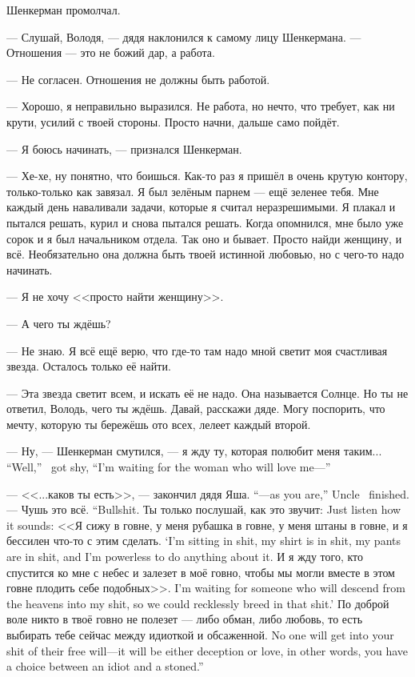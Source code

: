 Шенкерман промолчал.

--- Слушай, Володя, --- дядя наклонился к самому лицу Шенкермана.
--- Отношения --- это не божий дар, а работа.

--- Не согласен.
Отношения не должны быть работой.

--- Хорошо, я неправильно выразился.
Не работа, но нечто, что требует, как ни крути, усилий с твоей стороны.
Просто начни, дальше само пойдёт.

--- Я боюсь начинать, --- признался Шенкерман.

--- Хе-хе, ну понятно, что боишься.
Как-то раз я пришёл в очень крутую контору, только-только как завязал.
Я был зелёным парнем --- ещё зеленее тебя.
Мне каждый день наваливали задачи, которые я считал неразрешимыми.
Я плакал и пытался решать, курил и снова пытался решать.
Когда опомнился, мне было уже сорок и я был начальником отдела.
Так оно и бывает.
Просто найди женщину, и всё.
Необязательно она должна быть твоей истинной любовью, но с чего-то надо начинать.

--- Я не хочу <<просто найти женщину>>.

--- А чего ты ждёшь?

--- Не знаю.
Я всё ещё верю, что где-то там надо мной светит моя счастливая звезда.
Осталось только её найти.

--- Эта звезда светит всем, и искать её не надо.
Она называется Солнце.
Но ты не ответил, Володь, чего ты ждёшь.
Давай, расскажи дяде.
Могу поспорить, что мечту, которую ты бережёшь ото всех, лелеет каждый второй.

{--- Ну, --- Шенкерман смутился, --- я жду ту, которая полюбит меня таким...}
{``Well,'' \Shenkerman\ got shy, ``I'm waiting for the woman who will love me---''}

{---  <<...каков ты есть>>, --- закончил дядя Яша.}
{``---as you are,'' Uncle \Yasha\ finished.}
{--- Чушь это всё.}
{``Bullshit.}
{Ты только послушай, как это звучит:}
{Just listen how it sounds:}
{<<Я сижу в говне, у меня рубашка в говне, у меня штаны в говне, и я бессилен что-то с этим сделать.}
{`I'm sitting in shit, my shirt is in shit, my pants are in shit, and I'm powerless to do anything about it.}
{И я жду того, кто спустится ко мне с небес и залезет в моё говно, чтобы мы могли вместе в этом говне плодить себе подобных>>.}
{I'm waiting for someone who will descend from the heavens into my shit, so we could recklessly breed in that shit.'}
{По доброй воле никто в твоё говно не полезет --- либо обман, либо любовь, то есть выбирать тебе сейчас между идиоткой и обсаженной.}
{No one will get into your shit of their free will---it will be either deception or love, in other words, you have a choice between an idiot and a stoned.''}

